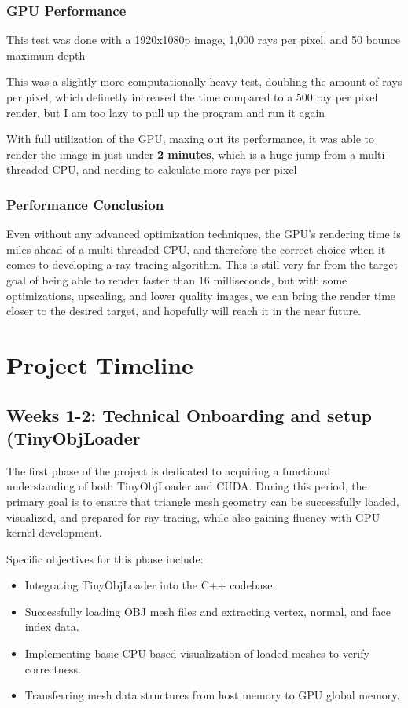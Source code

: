 \documentclass[11pt]{article}
\begin{document}
\subsubsection{GPU Performance}
This test was done with a 1920x1080p image, 1,000 rays per pixel, and 50 bounce maximum depth

This was a slightly more computationally heavy test, doubling the amount of rays per pixel, which definetly increased the time compared to a 500 ray per pixel render, but I am too lazy to pull up the program and run it again


With full utilization of the GPU, maxing out its performance, it was able to render the image in just under \textbf{2 minutes}, which is a huge jump from a multi-threaded CPU, and needing to calculate more rays per pixel

\subsubsection{Performance Conclusion}
Even without any advanced optimization techniques, the GPU's rendering time is miles ahead of a multi threaded CPU, and therefore the correct choice when it comes to developing a ray tracing algorithm. This is still very far from the target goal of being able to render faster than 16 milliseconds, but with some optimizations, upscaling, and lower quality images, we can bring the render time closer to the desired target, and hopefully will reach it in the near future.




\section{Project Timeline}



\subsection*{Weeks 1-2: Technical Onboarding and setup (TinyObjLoader}

The first phase of the project is dedicated to acquiring a functional understanding of both TinyObjLoader and CUDA. During this period, the primary goal is to ensure that triangle mesh geometry can be successfully loaded, visualized, and prepared for ray tracing, while also gaining fluency with GPU kernel development.

Specific objectives for this phase include:
\begin{itemize}
    
    \item Integrating TinyObjLoader into the C++ codebase.
    \item Successfully loading OBJ mesh files and extracting vertex, normal, and face index data.
    \item Implementing basic CPU-based visualization of loaded meshes to verify correctness.
    \item Transferring mesh data structures from host memory to GPU global memory.
\end{itemize}
\end{document}
